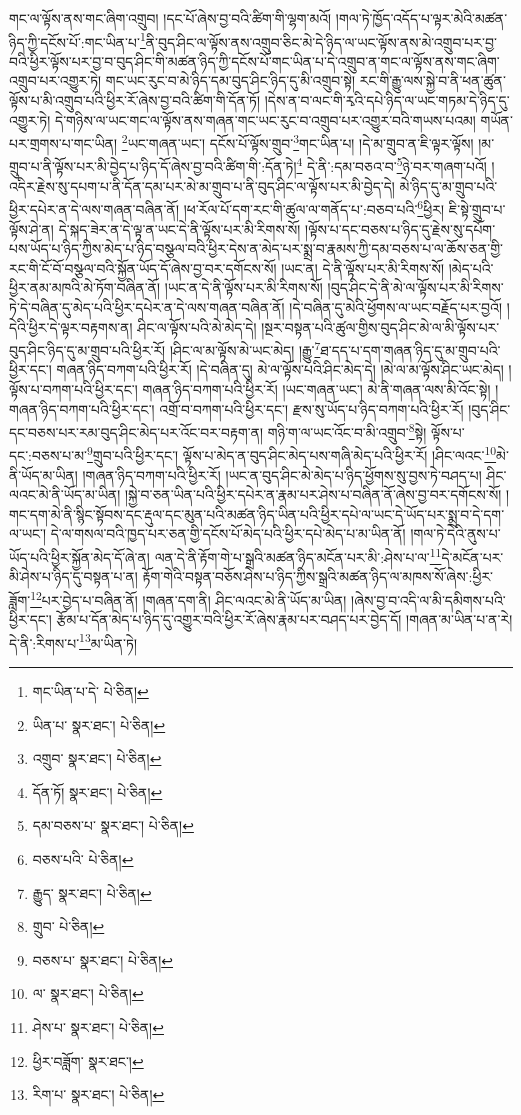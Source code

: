 གང་ལ་ལྟོས་ནས་གང་ཞིག་འགྲུབ། །དང་པོ་ཞེས་བྱ་བའི་ཚིག་གི་ལྷག་མའོ། །གལ་ཏེ་ཁྱོད་འདོད་པ་ལྟར་མེའི་མཚན་ཉིད་ཀྱི་དངོས་པོ་:གང་ཡིན་པ་\footnote{གང་ཡིན་པ་དེ་  པེ་ཅིན། }ནི་བུད་ཤིང་ལ་ལྟོས་ནས་འགྲུབ་ཅིང་མེ་དེ་ཉིད་ལ་ཡང་ལྟོས་ནས་མེ་འགྲུབ་པར་བྱ་བའི་ཕྱིར་ལྟོས་པར་བྱ་བ་བུད་ཤིང་གི་མཚན་ཉིད་ཀྱི་དངོས་པོ་གང་ཡིན་པ་དེ་འགྲུབ་ན་གང་ལ་ལྟོས་ནས་གང་ཞིག་འགྲུབ་པར་འགྱུར་ཏེ། གང་ཡང་རུང་བ་མེ་ཉིད་དམ་བུད་ཤིང་ཉིད་དུ་མི་འགྲུབ་སྟེ། རང་གི་རྒྱུ་ལས་སྐྱེ་བ་ནི་ཕན་ཚུན་ལྟོས་པ་མི་འགྲུབ་པའི་ཕྱིར་རོ་ཞེས་བྱ་བའི་ཚིག་གི་དོན་ཏོ། །དེས་ན་བ་ལང་གི་རྭའི་དཔེ་ཉིད་ལ་ཡང་གཏམ་དེ་ཉིད་དུ་འགྱུར་ཏེ། དེ་གཉིས་ལ་ཡང་གང་ལ་ལྟོས་ནས་གཞན་གང་ཡང་རུང་བ་འགྲུབ་པར་འགྱུར་བའི་གཡས་པའམ། གཡོན་པར་གྲགས་པ་གང་ཡིན། \footnote{ཡིན་པ་  སྣར་ཐང་།  པེ་ཅིན། }ཡང་གཞན་ཡང་། དངོས་པོ་ལྟོས་གྲུབ་\footnote{འགྲུབ་  སྣར་ཐང་།  པེ་ཅིན། }གང་ཡིན་པ། །དེ་མ་གྲུབ་ན་ཇི་ལྟར་ལྟོས། །མ་གྲུབ་པ་ནི་ལྟོས་པར་མི་བྱེད་པ་ཉིད་དོ་ཞེས་བྱ་བའི་ཚིག་གི་:དོན་ཏེ།\footnote{དོན་ཏོ།  སྣར་ཐང་།  པེ་ཅིན། } དེ་ནི་:དམ་བཅའ་བ་\footnote{དམ་བཅས་པ་  སྣར་ཐང་།  པེ་ཅིན། }ཉེ་བར་གཞག་པའོ། །འདིར་རྗེས་སུ་དཔག་པ་ནི་དོན་དམ་པར་མེ་མ་གྲུབ་པ་ནི་བུད་ཤིང་ལ་ལྟོས་པར་མི་བྱེད་དེ། མེ་ཉིད་དུ་མ་གྲུབ་པའི་ཕྱིར་དཔེར་ན་དེ་ལས་གཞན་བཞིན་ནོ། །ཕ་རོལ་པོ་དག་རང་གི་ཚུལ་ལ་གནོད་པ་:བཅབ་པའི་\footnote{བཅས་པའི་  པེ་ཅིན། }ཕྱིར། ཇི་སྟེ་གྲུབ་པ་ལྟོས་ཤེ་ན། དེ་སྐད་ཟེར་ན་དེ་ལྟ་ན་ཡང་དེ་ནི་ལྟོས་པར་མི་རིགས་སོ། །ལྟོས་པ་དང་བཅས་པ་ཉིད་དུ་རྗེས་སུ་དཔོག་པས་ཡོད་པ་ཉིད་ཀྱིས་མེད་པ་ཉིད་བསྩལ་བའི་ཕྱིར་དེས་ན་མེད་པར་སྨྲ་བ་རྣམས་ཀྱི་དམ་བཅས་པ་ལ་ཆོས་ཅན་གྱི་རང་གི་ངོ་བོ་བསྩལ་བའི་སྐྱོན་ཡོད་དོ་ཞེས་བྱ་བར་དགོངས་སོ། །ཡང་ན། དེ་ནི་ལྟོས་པར་མི་རིགས་སོ། །མེད་པའི་ཕྱིར་ནམ་མཁའི་མེ་ཏོག་བཞིན་ནོ། །ཡང་ན་དེ་ནི་ལྟོས་པར་མི་རིགས་སོ། །བུད་ཤིང་དེ་ནི་མེ་ལ་ལྟོས་པར་མི་རིགས་ཏེ་དེ་བཞིན་དུ་མེད་པའི་ཕྱིར་དཔེར་ན་དེ་ལས་གཞན་བཞིན་ནོ། །དེ་བཞིན་དུ་མེའི་ཕྱོགས་ལ་ཡང་བརྗོད་པར་བྱའོ། །དེའི་ཕྱིར་དེ་ལྟར་བརྟགས་ན། ཤིང་ལ་ལྟོས་པའི་མེ་མེད་དེ། །སྔར་བསྟན་པའི་ཚུལ་གྱིས་བུད་ཤིང་མེ་ལ་མི་ལྟོས་པར་བུད་ཤིང་ཉིད་དུ་མ་གྲུབ་པའི་ཕྱིར་རོ། །ཤིང་ལ་མ་ལྟོས་མེ་ཡང་མེད། །རྒྱུ་\footnote{རྒྱུད་  སྣར་ཐང་།  པེ་ཅིན། }ཐ་དད་པ་དག་གཞན་ཉིད་དུ་མ་གྲུབ་པའི་ཕྱིར་དང་། གཞན་ཉིད་བཀག་པའི་ཕྱིར་རོ། །དེ་བཞིན་དུ། མེ་ལ་ལྟོས་པའི་ཤིང་མེད་དེ། །མེ་ལ་མ་ལྟོས་ཤིང་ཡང་མེད། །ལྟོས་པ་བཀག་པའི་ཕྱིར་དང་། གཞན་ཉིད་བཀག་པའི་ཕྱིར་རོ། །ཡང་གཞན་ཡང་། མེ་ནི་གཞན་ལས་མི་འོང་སྟེ། །གཞན་ཉིད་བཀག་པའི་ཕྱིར་དང་། འགྲོ་བ་བཀག་པའི་ཕྱིར་དང་། རྫས་སུ་ཡོད་པ་ཉིད་བཀག་པའི་ཕྱིར་རོ། །བུད་ཤིང་དང་བཅས་པར་རམ་བུད་ཤིང་མེད་པར་འོང་བར་བརྟག་ན། གཉི་ག་ལ་ཡང་འོང་བ་མི་འགྲུབ་\footnote{གྲུབ་  པེ་ཅིན། }སྟེ། ལྟོས་པ་དང་:བཅས་པ་མ་\footnote{བཅས་པ་  སྣར་ཐང་།  པེ་ཅིན། }གྲུབ་པའི་ཕྱིར་དང་། ལྟོས་པ་མེད་ན་བུད་ཤིང་མེད་པས་གཞི་མེད་པའི་ཕྱིར་རོ། །ཤིང་ལའང་\footnote{ལ་  སྣར་ཐང་།  པེ་ཅིན། }མེ་ནི་ཡོད་མ་ཡིན། །གཞན་ཉིད་བཀག་པའི་ཕྱིར་རོ། །ཡང་ན་བུད་ཤིང་མེ་མེད་པ་ཉིད་ཕྱོགས་སུ་བྱས་ཏེ་བཤད་པ། ཤིང་ལའང་མེ་ནི་ཡོད་མ་ཡིན། །སྐྱེ་བ་ཅན་ཡིན་པའི་ཕྱིར་དཔེར་ན་རྣམ་པར་ཤེས་པ་བཞིན་ནོ་ཞེས་བྱ་བར་དགོངས་སོ། །གང་དག་མེ་ནི་སྙིང་སྟོབས་དང་རྡུལ་དང་མུན་པའི་མཚན་ཉིད་ཡིན་པའི་ཕྱིར་དཔེ་ལ་ཡང་དེ་ཡོད་པར་སྨྲ་བ་དེ་དག་ལ་ཡང་། དེ་ལ་གསལ་བའི་ཁྱད་པར་ཅན་གྱི་དངོས་པོ་མེད་པའི་ཕྱིར་དཔེ་མེད་པ་མ་ཡིན་ནོ། །གལ་ཏེ་དེའི་ནུས་པ་ཡོད་པའི་ཕྱིར་སྐྱོན་མེད་དོ་ཞེ་ན། ལན་དེ་ནི་རྟོག་གེ་པ་སྒྲའི་མཚན་ཉིད་མངོན་པར་མི་:ཤེས་པ་ལ་\footnote{ཤེས་པ་  སྣར་ཐང་།  པེ་ཅིན། }དེ་མངོན་པར་མི་ཤེས་པ་ཉིད་དུ་བསྟན་པ་ན། རྟོག་གེའི་བསྟན་བཅོས་ཤེས་པ་ཉིད་ཀྱིས་སྒྲའི་མཚན་ཉིད་ལ་མཁས་སོ་ཞེས་:ཕྱིར་ཟློག་\footnote{ཕྱིར་བཟློག་  སྣར་ཐང་། }པར་བྱེད་པ་བཞིན་ནོ། །གཞན་དག་ནི། ཤིང་ལའང་མེ་ནི་ཡོད་མ་ཡིན། །ཞེས་བྱ་བ་འདི་ལ་མི་དམིགས་པའི་ཕྱིར་དང་། རྩོམ་པ་དོན་མེད་པ་ཉིད་དུ་འགྱུར་བའི་ཕྱིར་རོ་ཞེས་རྣམ་པར་བཤད་པར་བྱེད་དོ། །གཞན་མ་ཡིན་པ་ན་རེ། དེ་ནི་:རིགས་པ་\footnote{རིག་པ་  སྣར་ཐང་།  པེ་ཅིན། }མ་ཡིན་ཏེ། 